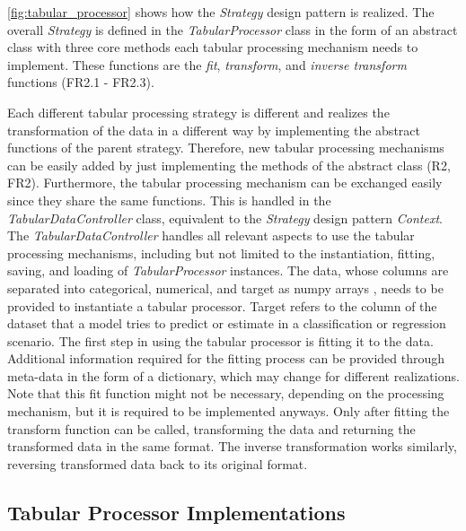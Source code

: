 \autoref{fig:tabular_processor} shows how the \textit{Strategy} design pattern is realized.
The overall \textit{Strategy} is defined in the \textit{TabularProcessor} class in the form of an abstract class with three core methods each tabular processing mechanism needs to implement.
These functions are the \textit{fit}, \textit{transform}, and \textit{inverse transform} functions (FR2.1 - FR2.3).

Each different tabular processing strategy is different and realizes the transformation of the data in a different way by implementing the abstract functions of the parent strategy.
Therefore, new tabular processing mechanisms can be easily added by just implementing the methods of the abstract class (R2, FR2).
Furthermore, the tabular processing mechanism can be exchanged easily since they share the same functions.
This is handled in the \textit{TabularDataController} class, equivalent to the \textit{Strategy} design pattern \textit{Context}.
The \textit{TabularDataController} handles all relevant aspects to use the tabular processing mechanisms, including but not limited to the instantiation, fitting, saving, and loading of \textit{TabularProcessor} instances.
The data, whose columns are separated into categorical, numerical, and target as numpy arrays \cite{harris2020array}, needs to be provided to instantiate a tabular processor.
Target refers to the column of the dataset that a model tries to predict or estimate in a classification or regression scenario.
The first step in using the tabular processor is fitting it to the data.
Additional information required for the fitting process can be provided through meta-data in the form of a dictionary, which may change for different realizations.
Note that this fit function might not be necessary, depending on the processing mechanism, but it is required to be implemented anyways.
Only after fitting the transform function can be called, transforming the data and returning the transformed data in the same format.
The inverse transformation works similarly, reversing transformed data back to its original format.


\subsection{Tabular Processor Implementations}
\label{ch:architecture-tabularProcessor-implementations}

